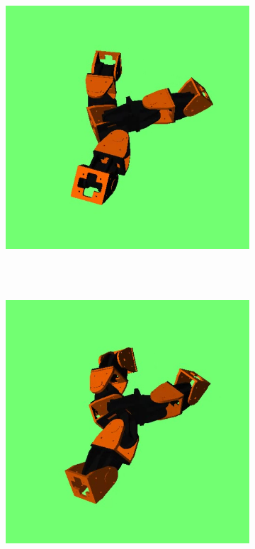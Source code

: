 \begin{figure}[h]
		\centering
        \begin{subfigure}[b]{0.18\textwidth}
                \centering
                \includegraphics[width=\textwidth]{images/results_7_gait_01.png}
                 \\~
        \end{subfigure}
        ~
        \begin{subfigure}[b]{0.18\textwidth}
                \centering
                \includegraphics[width=\textwidth]{images/results_7_gait_02.png}

\end{subfigure}
\end{figure}
